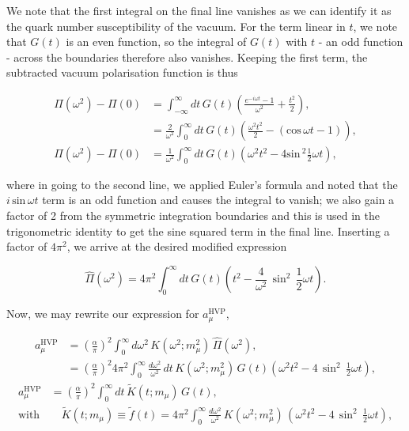 \documentclass{article}
\numberwithin{equation}{section} %
\begin{document}
\noindent We note that the first integral on the final line vanishes as we can identify it as the quark number susceptibility of the vacuum. For the term linear in $t$, we note that $G(t)$ is an even function, so the integral of $G(t)$ with $t$ - an odd function - across the boundaries therefore also vanishes. Keeping the first term, the subtracted vacuum polarisation function is thus

\begin{equation}
\begin{split}
\Pi(\omega^2)-\Pi(0) &= \int^\infty_{-\infty} dt \, G(t) \left( \frac{e^{-i\omega t} - 1}{\omega^2} + \frac{t^2}{2}\right),\\
&=\frac{2}{\omega^2}\int^\infty_0dt \, G(t) \left( \frac{\omega^2t^2}{2}-(\mathrm{cos\,} \omega t- 1) \right),\\
\Pi(\omega^2)-\Pi(0) &=\frac{1}{\omega^2}\int^\infty_0dt \, G(t) \left( \omega^2t^2-4\mathrm{sin\,}^2 \frac{1}{2}\omega t \right),
\end{split}
\end{equation}

\noindent where in going to the second line, we applied Euler's formula and noted that the $i\, \mathrm{sin\,}\omega t$ term is an odd function and causes the integral to vanish; we also gain a factor of 2 from the symmetric integration boundaries and this is used in the trigonometric identity to get the sine squared term in the final line. Inserting a factor of $4\pi^2$, we arrive at the desired modified expression

\begin{equation}
\hat{\Pi}(\omega^2) = 4\pi^2\int^\infty_0 dt\, G(t) \left( t^2-\frac{4}{\omega^2}\,\sin^2\, \frac{1}{2}\omega t \right).
\end{equation}

Now, we may rewrite our expression for $a_\mu^\mathrm{HVP}$,

\begin{equation}
\begin{split}
a_\mu^\mathrm{HVP} &= \left(\frac{\alpha}{\pi}\right)^2 \int_0^\infty d\omega^2 \, K(\omega^2;m_\mu^2) \,\hat{\Pi}(\omega^2),\\
&= \left(\frac{\alpha}{\pi}\right)^2 4\pi^2  \int_0^\infty \frac{d\omega^2}{\omega^2} \, dt\, K(\omega^2;m_\mu^2) \,G(t) \left( \omega^2 t^2-4\,\sin^2\, \frac{1}{2}\omega t \right),
\end{split}
\end{equation}
\begin{equation}
\begin{split}
a_\mu^\mathrm{HVP}&= \left(\frac{\alpha}{\pi}\right)^2  \int_0^\infty dt\, \tilde{K}(t;m_\mu) \,G(t) ,\\
\mathrm{with}& \quad \tilde{K}(t;m_\mu) \equiv \tilde{f}(t) = 4\pi^2 \int_0^\infty \frac{d\omega^2}{\omega^2} \, K(\omega^2;m_\mu^2) \,\left( \omega^2t^2-4\,\sin^2\, \frac{1}{2}\omega t \right),
\end{split}
\label{amu}
\end{equation}
\end{document}
